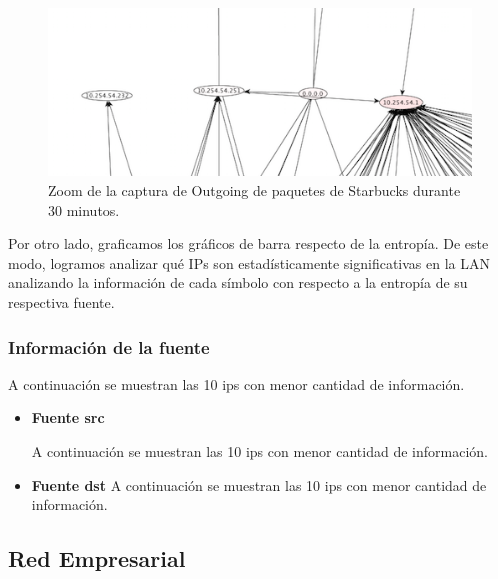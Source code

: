 \documentclass[10pt, a4paper]{article}
\begin{document}
\begin{figure}[H] %
\begin{center}
\includegraphics[width=400pt]{../imgs/zoom-starbucks-outgoing2.png}
\caption{Zoom de la captura de Outgoing de paquetes de Starbucks durante 30 minutos.}
\end{center}
\end{figure}

Por otro lado, graficamos los gráficos de barra respecto de la entropía. De este modo, logramos analizar qué IPs son estadísticamente significativas en la LAN analizando la información de cada símbolo con respecto a la entropía de su respectiva fuente.

\subsubsection{Información de la fuente}

A continuaci\'on se muestran las 10 ips con menor cantidad de informaci\'on.

\begin{itemize}
\item \textbf{Fuente src}

A continuaci\'on se muestran las 10 ips con menor cantidad de informaci\'on.

%
\vspace{2cm}

\item \textbf{Fuente dst}
A continuaci\'on se muestran las 10 ips con menor cantidad de informaci\'on.

%
\vspace{2cm}

\end{itemize}

\subsection{Red Empresarial}
\end{document}
